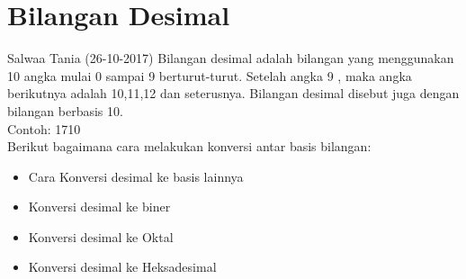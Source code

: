 {\section{Bilangan Desimal} Salwaa Tania (26-10-2017)
Bilangan desimal adalah bilangan yang menggunakan 10 angka mulai 0 sampai 9 berturut-turut. Setelah angka 9 , maka angka berikutnya adalah 10,11,12 dan seterusnya. Bilangan desimal disebut juga dengan bilangan berbasis 10.
\\Contoh: 1710
\\Berikut bagaimana cara melakukan konversi antar basis bilangan: 
\begin{itemize}
	\item Cara Konversi desimal ke basis lainnya
	\item Konversi desimal ke biner
	\item Konversi desimal ke Oktal
	\item Konversi desimal ke Heksadesimal
\end{itemize}
}
